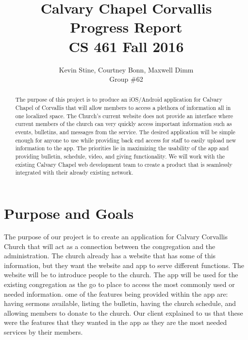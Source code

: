 \documentclass[letterpaper,10pt,draftclsnofoot,onecolumn,titlepage]{IEEEtran}
\def\name{Kevin Stine, Courtney Bonn, Maxwell Dimm}
\def\team{Calvary Chapel Corvallis}
\def\grp{Group \#62}
\begin{document}
	\title{\huge \team \\ Progress Report\\ CS 461 Fall 2016}
	\author{\large \name \\ \grp}



	\maketitle


		\begin{abstract}The purpose of this project is to produce an iOS/Android application for Calvary Chapel of Corvallis that will allow members to access a plethora of information all in one localized space.
		The Church's current website does not provide an interface where current members of the church can very quickly access important information such as events, bulletins, and messages from the service.
		The desired application will be simple enough for anyone to use while providing back end access for staff to easily upload new information to the app.
		The priorities lie in maximizing the usability of the app and providing bulletin, schedule, video, and giving functionality.
		We will work with the existing Calvary Chapel web development team to create a product that is seamlessly integrated with their already existing network.
		\end{abstract}
		
		\clearpage



		

		\section{Purpose and Goals}
		The purpose of our project is to create an application for Calvary Corvallis Church that will act as a connection between the congregation and the administration. 
		The church already has a website that has some of this information, but they want the website and app to serve different functions. The website will be to introduce people to the church. 
		The app will be used for the existing congregation as the go to place to access the most commonly used or needed information. 
		ome of the features being provided within the app are: having sermons available, listing the bulletin, having the church schedule, and allowing members to donate to the church. 
		Our client explained to us that these were the features that they wanted in the app as they are the most needed services by their members.
\end{document}
